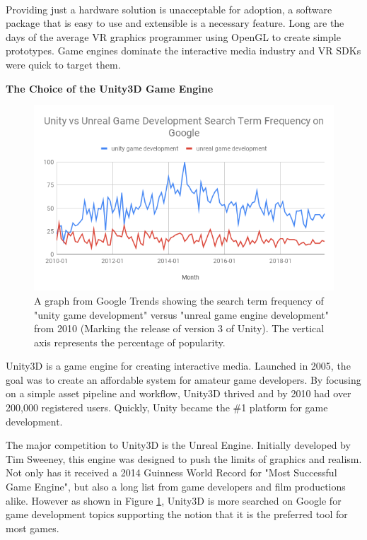 \label{chapter:softwareChapter}

\label{sec:swIntroductionSection}\\

Providing just a hardware solution is unacceptable for adoption, a software package that is easy to use and extensible is a necessary feature. Long are the days of the average VR graphics programmer using OpenGL to create simple prototypes. Game engines dominate the interactive media industry and VR SDKs were quick to target them.

\noindent\textbf{The Choice of the Unity3D Game Engine}

\begin{figure}[H]
	\centering
	\includegraphics[width=6in]{images/googletrends-unity-game-dev-vs-unreal}
	\caption[Unity vs Unreal Search Term Frequency]{A graph from Google Trends showing the search term frequency of "unity game development" versus "unreal game engine development" from 2010 (Marking the release of version 3 of Unity). The vertical axis represents the percentage of popularity.}
	\label{fig:googletrends-unity-game-dev-vs-unreal}
\end{figure}

\filbreak
Unity3D is a game engine for creating interactive media. Launched in 2005, the goal was to create an affordable system for amateur game developers.\cite{unityHistory} By focusing on a simple asset pipeline and workflow, Unity3D thrived and by 2010 had over 200,000 registered users. Quickly, Unity became the \#1 platform for game development. \cite{unity3ReleaseNews}

The major competition to Unity3D is the Unreal Engine. Initially developed by Tim Sweeney, this engine was designed to push the limits of graphics and realism. Not only has it received a 2014 Guinness World Record for "Most Successful Game Engine", but also a long list from game developers and film productions alike.\cite{unrealAwards} However as shown in Figure \ref{fig:googletrends-unity-game-dev-vs-unreal}, Unity3D is more searched on Google for game development topics supporting the notion that it is the preferred tool for most games. 

